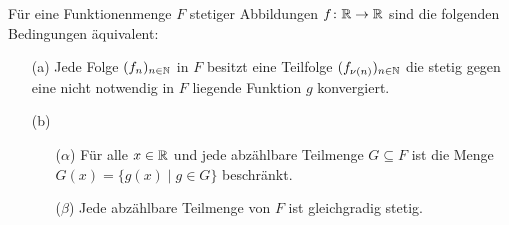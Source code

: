 \newpage
\begin{thm}
  Für eine Funktionenmenge $F$ stetiger Abbildungen $f \colon \mathbb{R} \to \mathbb{R}$ sind die folgenden Bedingungen äquivalent:
  \begin{itemize}
    \item[(a)] Jede Folge $(f_n)_{n \in \mathbb{N}}$ in $F$ besitzt eine Teilfolge $(f_{\nu(n)})_{n \in \mathbb{N}}$ die stetig gegen eine nicht notwendig in $F$ liegende Funktion $g$ konvergiert.

    \item[(b)]
      \begin{itemize}
        \item[($\alpha$)] Für alle $x \in \mathbb{R}$ und jede abzählbare Teilmenge $G \subseteq F$ ist die Menge $G(x) = \{ g(x) \mid g \in G \}$ beschränkt.
        \item[($\beta$)] Jede abzählbare Teilmenge von $F$ ist gleichgradig stetig.
      \end{itemize}
  \end{itemize}
\end{thm}

